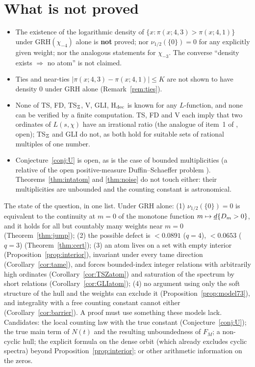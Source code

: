 \section{What is not proved}\label{sec:open}

\begin{itemize}
\item The existence of the logarithmic density of $\{x:\pi(x;4,3)>\pi(x;4,1)\}$ under GRH$(\chi_{-4})$ alone is \textbf{not} proved; nor $\nu_{1/2}(\{0\})=0$ for any explicitly given weight; nor the analogous statements for $\chi_{-3}$. The converse ``density exists $\Rightarrow$ no atom'' is not claimed.
\item Ties and near-ties $|\pi(x;4,3)-\pi(x;4,1)|\le K$ are not shown to have density $0$ under GRH alone (Remark~\ref{rem:ties}).
\item None of TS, FD, TS$_\mathbb Z$, V, GLI, H$_{\rm dec}$ is known for any $L$-function, and none can be verified by a finite computation. TS, FD and V each imply that two ordinates of $L(s,\chi)$ have an irrational ratio (the analogue of item~1 of \cite{HKMN}, open); TS$_\mathbb Z$ and GLI do not, as both hold for suitable sets of rational multiples of one number.
\item Conjecture~\ref{conj:U} is open, as is the case of bounded multiplicities (a relative of the open positive-measure Duffin--Schaeffer problem \cite{BEL}). Theorems~\ref{thm:intatom} and \ref{thm:noise} do not touch either: their multiplicities are unbounded and the counting constant is astronomical.
\end{itemize}

The state of the question, in one list. Under GRH alone: (1) $\nu_{1/2}(\{0\})=0$ is equivalent to the continuity at $m=0$ of the monotone function $m\mapsto\underline d\{D_m>0\}$, and it holds for all but countably many weights near $m=0$ (Theorem~\ref{thm:jump}); (2) the possible defect is $<0.0891$ ($q=4$), $<0.0653$ ($q=3$) (Theorem~\ref{thm:cert}); (3) an atom lives on a set with empty interior (Proposition~\ref{prop:interior}), invariant under every tame direction (Corollary~\ref{cor:tame}), and forces bounded-index integer relations with arbitrarily high ordinates (Corollary~\ref{cor:TSZatom}) and saturation of the spectrum by short relations (Corollary~\ref{cor:GLIatom}); (4) no argument using only the soft structure of the hull and the weights can exclude it (Proposition~\ref{prop:model73}), and integrality with a free counting constant cannot either (Corollary~\ref{cor:barrier}). A proof must use something these models lack. Candidates: the local counting law with the true constant (Conjecture~\ref{conj:U}); the true main term of $N(t)$ and the resulting unboundedness of $F_M$; a non-cyclic hull; the explicit formula on the dense orbit (which already excludes cyclic spectra) beyond Proposition~\ref{prop:interior}; or other arithmetic information on the zeros.

